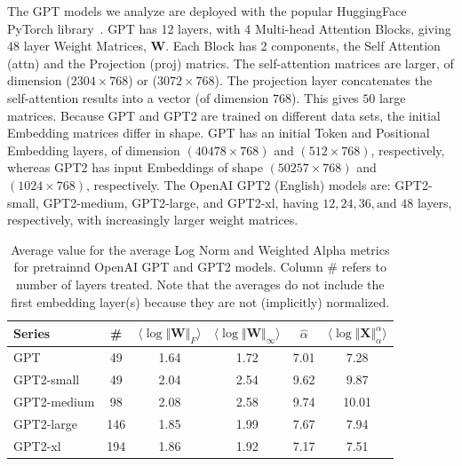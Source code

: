 The GPT models we analyze are deployed with the popular HuggingFace PyTorch library~\cite{huggingface}.
GPT has 12 layers, with 4 Multi-head Attention Blocks, giving $48$ layer Weight Matrices, $\mathbf{W}$.
Each Block has 2 components, the Self Attention (attn) and the Projection (proj) matrics.  
The self-attention  matrices are larger, of dimension ($2304\times 768$) or ($3072\times 768$).
The projection layer concatenates the self-attention results into a vector (of dimension $768$).
This gives $50$ large matrices.
%
Because GPT and GPT2 are trained on different data sets, the initial Embedding matrices differ in shape.
GPT has an initial Token and Positional Embedding layers, of dimension $(40478\times 768)$ and $(512\times 768)$, respectively, whereas GPT2 has input Embeddings of shape $(50257\times 768)$ and $(1024\times 768)$, respectively. 
%
The OpenAI GPT2 (English) models are: GPT2-small, GPT2-medium, GPT2-large, and GPT2-xl, having $12, 24, 36, \text{and } 48$ layers, respectively, with increasingly larger weight matrices.


\begin{table}[t]
\small
\begin{center}
\begin{tabular}{|p{1in}|c|c|c|c|c|}
\hline
 Series  & \#   & $\langle\log\Vert\mathbf{W}\Vert_{F}\rangle$ & $\langle\log\Vert\mathbf{W}\Vert_{\infty}\rangle$ & $\hat{\alpha}$ & $\langle\log\Vert\mathbf{X}\Vert^{\alpha}_{\alpha}\rangle$ \\
\hline
GPT & 49 & 1.64  & 1.72 & 7.01 & 7.28 \\
GPT2-small & 49 & 2.04  & 2.54& 9.62 & 9.87 \\
\hline
GPT2-medium & 98 & 2.08 & 2.58& 9.74 & 10.01 \\
GPT2-large & 146 & 1.85 & 1.99& 7.67 & 7.94 \\
GPT2-xl & 194 & 1.86 & 1.92 & 7.17 & 7.51 \\
\hline
\end{tabular}
\end{center}
\caption{Average value for the average Log Norm and Weighted Alpha metrics for pretrainnd OpenAI GPT and GPT2 models. Column \# refers to number of layers treated.  Note that the averages do not include the first embedding layer(s) because they are not (implicitly) normalized.  }
\label{table:nlp}
\end{table}


